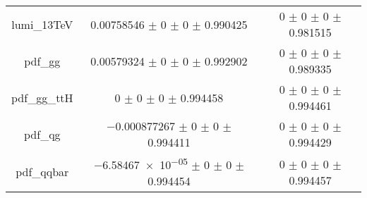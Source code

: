 \begin{table}
\begin{tabular}{ccc}
lumi\_13TeV & \num{0.00758546} $\pm$ \num{0} $\pm$ \num{0} $\pm$ \num{0.990425} & \num{0} $\pm$ \num{0} $\pm$ \num{0} $\pm$ \num{0.981515}\\
pdf\_gg & \num{0.00579324} $\pm$ \num{0} $\pm$ \num{0} $\pm$ \num{0.992902} & \num{0} $\pm$ \num{0} $\pm$ \num{0} $\pm$ \num{0.989335}\\
pdf\_gg\_ttH & \num{0} $\pm$ \num{0} $\pm$ \num{0} $\pm$ \num{0.994458} & \num{0} $\pm$ \num{0} $\pm$ \num{0} $\pm$ \num{0.994461}\\
pdf\_qg & \num{-0.000877267} $\pm$ \num{0} $\pm$ \num{0} $\pm$ \num{0.994411} & \num{0} $\pm$ \num{0} $\pm$ \num{0} $\pm$ \num{0.994429}\\
pdf\_qqbar & \num{-6.58467e-05} $\pm$ \num{0} $\pm$ \num{0} $\pm$ \num{0.994454} & \num{0} $\pm$ \num{0} $\pm$ \num{0} $\pm$ \num{0.994457}\\
\bottomrule
\end{tabular}
\end{table}